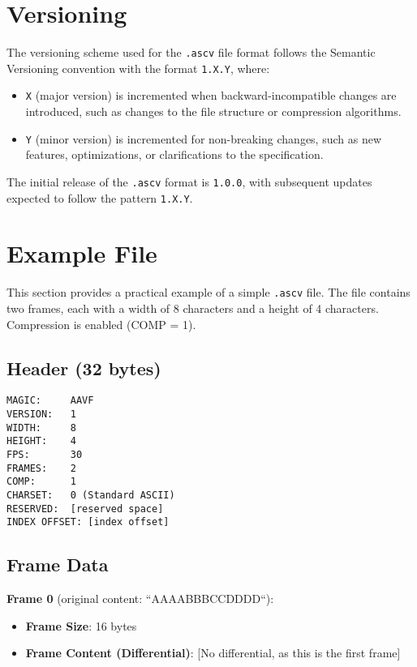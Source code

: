 \documentclass{article}
\begin{document}
\section{Versioning}

The versioning scheme used for the \texttt{.ascv} file format follows the Semantic Versioning convention with the format \texttt{1.X.Y}, where:

\begin{itemize}
    \item \texttt{X} (major version) is incremented when backward-incompatible changes are introduced, such as changes to the file structure or compression algorithms.
    \item \texttt{Y} (minor version) is incremented for non-breaking changes, such as new features, optimizations, or clarifications to the specification.
\end{itemize}

The initial release of the \texttt{.ascv} format is \texttt{1.0.0}, with subsequent updates expected to follow the pattern \texttt{1.X.Y}.

\section{Example File}

This section provides a practical example of a simple \texttt{.ascv} file. The file contains two frames, each with a width of 8 characters and a height of 4 characters. Compression is enabled (COMP = 1).

\subsection{Header (32 bytes)}

\begin{verbatim}
MAGIC:     AAVF
VERSION:   1
WIDTH:     8
HEIGHT:    4
FPS:       30
FRAMES:    2
COMP:      1
CHARSET:   0 (Standard ASCII)
RESERVED:  [reserved space]
INDEX OFFSET: [index offset]
\end{verbatim}

\subsection{Frame Data}

\textbf{Frame 0} (original content: ``AAAABBBCCDDDD``):

\begin{itemize}
    \item \textbf{Frame Size}: 16 bytes
    \item \textbf{Frame Content (Differential)}: [No differential, as this is the first frame]
\end{itemize}
\end{document}
